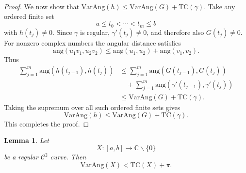\documentclass[reqno]{amsart}
\newtheorem{lemma}[theorem]{Lemma}
\theoremstyle{definition}
\newcommand{\C}{\mathbb{C}}
\newcommand{\ang}{\mathrm{ang}}
\newcommand{\T}{\mathrm{TC}}
\newcommand{\VA}{\mathrm{VarAng}}
\newcommand{\cC}{\mathcal{C}}
\numberwithin{equation}{section}
\begin{document}
\begin{proof}
We now show that $\VA(h)\le \VA(G)+\T(\gamma)$.
Take any ordered finite set
\[a\le t_0<\cdots<t_m\le b \]
with $h(t_j)\ne0$. Since $\gamma$ is regular, $\gamma'(t_j)\ne0$, and therefore also $G(t_j)\ne0$. For nonzero complex numbers the angular distance satisfies
\[
\ang(u_1v_1,u_2v_2)\le \ang(u_1,u_2)+\ang(v_1,v_2).\]
Thus
\begin{align*}
\sum_{j=1}^m \ang\left(h(t_{j-1}),h(t_j)\right)
&\le
\sum_{j=1}^m \ang\left(G(t_{j-1}),G(t_j)\right)\\
&\quad+
\sum_{j=1}^m \ang\left(\gamma'(t_{j-1}),\gamma'(t_j)\right)\\
&\le \VA(G)+\T(\gamma).
\end{align*}
Taking the supremum over all such ordered finite sets gives
\[
\VA(h)\le \VA(G)+\T(\gamma).
\]
This completes the proof.
\end{proof}


\begin{lemma}\label{L3}
Let
\[X:[a,b]\longrightarrow \C\backslash\{0\}
\]
be a regular $\cC^2$ curve. Then
\[\VA(X)<\T(X)+\pi.\]
\end{lemma}
\end{document}
